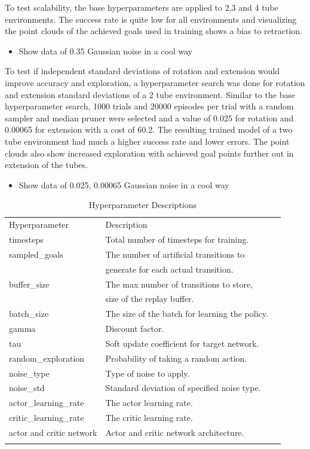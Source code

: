 To test scalability, the base hyperparameters are applied to 2,3 and 4 tube environments. The success rate is quite low for all environments and visualizing the point clouds of the achieved goals used in training shows a bias to retraction.
\begin{itemize}
    \item Show data of 0.35 Gaussian noise in a cool way
\end{itemize}
To test if independent standard deviations of rotation and extension would improve accuracy and exploration, a hyperparameter search was done for rotation and extension standard deviations of a 2 tube environment. Similar to the base hyperparameter search, 1000 trials and 20000 episodes per trial with a random sampler and median pruner were selected and a value of 0.025 for rotation and 0.00065 for extension with a cost of 60.2. The resulting trained model of a two tube environment had much a higher success rate and lower errors. The point clouds also show increased exploration with achieved goal points further out in extension of the tubes.
\begin{itemize}
    \item Show data of 0.025, 0.00065 Gaussian noise in a cool way
\end{itemize}
\begin{table}
\caption{Hyperparameter Descriptions}
\label{tab:1}       %
\begin{tabular}{lll}
\hline\noalign{\smallskip}
Hyperparameter & Description\\
\noalign{\smallskip}\hline\noalign{\smallskip}
timesteps & Total number of timesteps for training.\\
sampled\_goals & The number of artificial transitions to \\
& generate for each actual transition. \\
buffer\_size & The max number of transitions to store,\\
&  size of the replay buffer.\\
batch\_size &  The size of the batch for learning the policy.\\
gamma & Discount factor.\\
tau & Soft update coefficient for target network.\\
random\_exploration & Probability of taking a random action.\\
noise\_type & Type of noise to apply.\\
noise\_std & Standard deviation of specified noise type.\\
actor\_learning\_rate & The actor learning rate.\\
critic\_learning\_rate & The critic learning rate.\\
actor and critic network & Actor and critic network architecture.\\

\noalign{\smallskip}\hline
\end{tabular}
\end{table}

